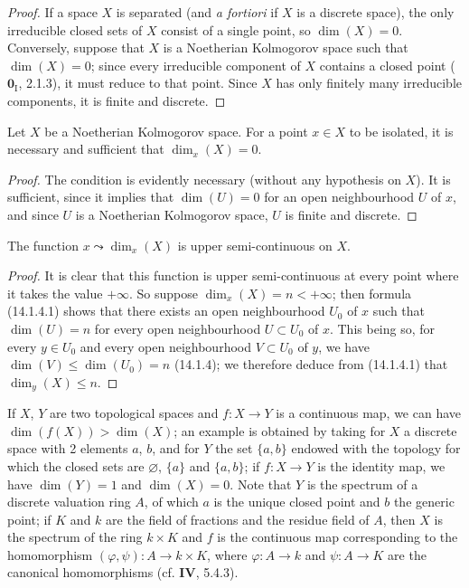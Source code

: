 \begin{proof}
If a space $X$ is separated (and \emph{a fortiori} if $X$ is a discrete
space), the only irreducible closed sets of $X$ consist of a single
point, so $\dim(X)=0$. Conversely, suppose that $X$ is a Noetherian
Kolmogorov space such that $\dim(X)=0$; since every irreducible
component of $X$ contains a closed point ($\mathbf{0}_{\mathrm I}$, 2.1.3), it
must reduce to that point. Since $X$ has only finitely many irreducible
components, it is finite and discrete.
\end{proof}

\begin{corollary}[14.1.10]
\label{0.14.1.10}
Let $X$ be a Noetherian Kolmogorov space. For a point $x\in X$ to be
isolated, it is necessary and sufficient that $\dim_x(X)=0$.
\end{corollary}

\begin{proof}
The condition is evidently necessary (without any hypothesis on $X$). It is
sufficient,
since it implies that $\dim(U)=0$ for an open neighbourhood $U$ of $x$, and
since $U$ is a Noetherian Kolmogorov space, $U$ is finite and discrete.
\end{proof}

\begin{proposition}[14.1.11]
\label{0.14.1.11}
The function $x\leadsto\dim_x(X)$ is upper semi-continuous on $X$.
\end{proposition}

\begin{proof}
It is clear that this function is upper semi-continuous at every
point where it takes the value $+\infty$. So suppose $\dim_x(X)=n<+\infty$; then
formula (14.1.4.1) shows that there exists an open neighbourhood $U_0$ of $x$ such
that $\dim(U)=n$ for every open neighbourhood $U\subset U_0$ of $x$. This being so,
for every $y\in U_0$ and every open neighbourhood $V\subset U_0$ of $y$, we have
$\dim(V)\leq\dim(U_0)=n$ (14.1.4); we therefore deduce from (14.1.4.1) that
$\dim_y(X)\leq n$.
\end{proof}

\begin{remark}[14.1.12]
\label{0.14.1.12}
If $X$, $Y$ are two topological spaces and $f:X\to Y$ is a continuous
map, we can have $\dim(f(X))>\dim(X)$; an example is obtained by taking
for $X$ a discrete space with 2 elements $a$, $b$, and for $Y$ the set
$\{a,b\}$ endowed with the topology for which the closed sets are
$\varnothing$, $\{a\}$ and $\{a,b\}$; if $f:X\to Y$ is the identity
map, we have $\dim(Y)=1$ and $\dim(X)=0$. Note that $Y$ is the spectrum
of a discrete valuation ring $A$, of which $a$ is the unique closed point and
$b$ the generic point; if $K$ and $k$ are the field of fractions and the
residue field of $A$, then $X$ is the spectrum of the ring $k\times K$ and $f$
is the continuous map corresponding to the homomorphism
$(\varphi,\psi):A\to k\times K$, where $\varphi:A\to k$ and $\psi:A\to K$ are
the canonical homomorphisms (cf. \textbf{IV}, 5.4.3).
\end{remark}

